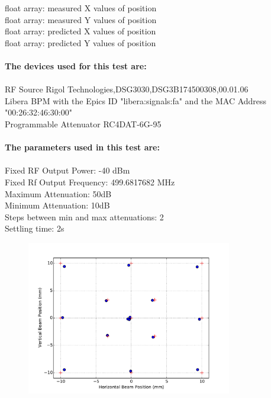 \documentclass[a4paper, 11pt]{article}%
\begin{document}
        float array: measured X values of position\\
        float array: measured Y values of position\\
        float array: predicted X values of position\\
        float array: predicted Y values of position\\~\\
\textbf{The devices used for this test are:}\\\\%
RF Source Rigol Technologies,DSG3030,DSG3B174500308,00.01.06\\%
Libera BPM with the Epics ID "libera:signals:fa" and the MAC Address "00:26:32:46:30:00"\\%
Programmable Attenuator RC4DAT-6G-95\\%
\\%
\textbf{The parameters used in this test are:}\\\\%
Fixed RF Output Power: -40 dBm\\%
Fixed Rf Output Frequency: 499.6817682 MHz\\%
Maximum Attenuation: 50dB\\%
Minimum Attenuation: 10dB\\%
Steps between min and max attenuations: 2\\%
Settling time: 2s\\

%


\begin{figure}[htbp]%
\centering%
\includegraphics[width=0.8\textwidth]{./Results/beam_position_attenuation_permutation}%
\caption{}%
\end{figure}
\end{document}
